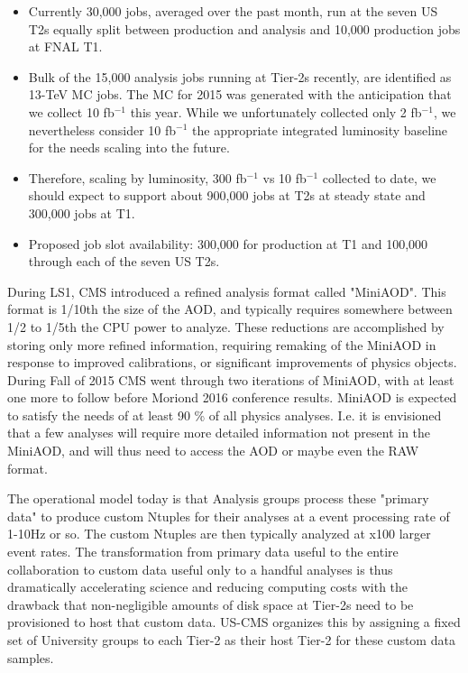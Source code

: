 \documentclass[11pt,a4paper]{article}
\begin{document}
\begin{itemize}
\item Currently 30,000 jobs, averaged over the past month, run at the seven 
US T2s equally split between production and analysis and 10,000 production
jobs at FNAL T1.
\item Bulk of the 15,000 analysis jobs running at Tier-2s recently, are 
identified as 13-TeV MC jobs.  The MC for 2015 was generated with the
anticipation that we collect 10 fb$^{-1}$ this year.  While we unfortunately
collected only 2 fb$^{-1}$, we nevertheless consider 10 fb$^{-1}$ the appropriate
integrated luminosity baseline for the needs scaling into the future. 
\item Therefore, scaling by luminosity, 300 fb$^{-1}$ vs 10 fb$^{-1}$ collected 
to date, we should expect to support about 900,000 jobs at T2s at steady state 
and 300,000 jobs at T1.
\item Proposed job slot availability: 300,000 for production at T1 and 100,000 through each of the seven US T2s.
\end{itemize}


During LS1, CMS introduced a refined analysis format called "MiniAOD".
This format is 1/10th the size of the AOD, and typically requires somewhere between 1/2 to 1/5th the CPU power to
analyze. These reductions are accomplished by storing only more refined information, requiring remaking of the MiniAOD
in response to improved calibrations, or significant improvements of physics objects. During Fall of 2015 CMS went through two iterations
of MiniAOD, with at least one more to follow before Moriond 2016 conference results.
MiniAOD is expected to satisfy the needs of at least 90 \% of all physics analyses. I.e. it is envisioned that a few analyses will
require more detailed information not present in the MiniAOD, and will thus need to access the AOD or maybe even the RAW format.

The operational model today is that Analysis groups process these "primary data" to produce custom 
Ntuples for their analyses at a event processing rate of 1-10Hz or so. The custom Ntuples are then typically 
analyzed at x100 larger event rates. The transformation from primary data useful to the entire collaboration to custom data useful
only to a handful analyses is thus dramatically accelerating science and reducing computing costs with the drawback that non-negligible
amounts of disk space at Tier-2s need to be provisioned to host that custom data. US-CMS organizes this by assigning a fixed set of 
University groups to each Tier-2 as their host Tier-2 for these custom data samples.
\end{document}
